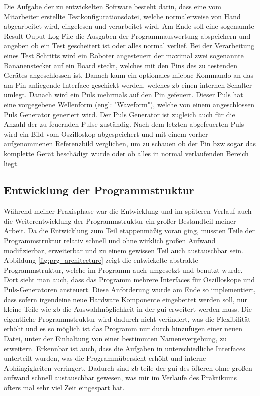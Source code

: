 Die Aufgabe der zu entwickelten Software besteht darin, dass eine vom Mitarbeiter erstellte Testkonfigurationsdatei, welche normalerweise von Hand abgearbeitet wird, eingelesen und verarbeitet wird. Am Ende soll eine sogenannte Result Ouput Log File die Ausgaben der Programmauswertung abspeichern und angeben ob ein Test gescheitert ist oder alles normal verlief.
Bei der Verarbeitung eines Test Schritts wird ein Roboter angesteuert der maximal zwei sogenannte Bananenstecker auf ein Board steckt, welches mit den Pins des zu testenden Gerätes angeschlossen ist. Danach kann ein optionales \ac{micbac} Kommando an das am Pin anliegende Interface geschickt werden, welches \ac{zb} einen internen Schalter umlegt. Danach wird ein Puls mehrmals auf den Pin gefeuert. Dieser Puls hat eine vorgegebene Wellenform (engl: "Waveform"), welche von einem angeschlossen Puls Generator generiert wird. Der Puls Generator ist zugleich auch für die Anzahl der zu feuernden Pulse zuständig. Nach dem letzten abgefeuerten Puls wird ein Bild vom Oszilloskop abgespeichert und mit einem vorher aufgenommenen Referenzbild verglichen, um zu schauen ob der Pin \ac{bzw} sogar das komplette Gerät beschädigt wurde oder ob alles in normal verlaufenden Bereich liegt. 


\subsection{Entwicklung der Programmstruktur}
\label{subsec:entw-prgstr}

Während meiner Praxisphase war die Entwicklung und im späteren Verlauf auch die Weiterentwicklung der Programmstruktur ein großer Bestandteil meiner Arbeit. Da die Entwicklung zum Teil etappenmäßig voran ging, mussten Teile der Programmstruktur relativ schnell und ohne wirklich großen Aufwand modifizierbar, erweiterbar und zu einem gewissen Teil auch austauschbar sein. Abbildung \ref{fig:prg_architecture} zeigt die entwickelte abstrakte Programmstruktur, welche im Programm auch umgesetzt und benutzt wurde. Dort sieht man auch, dass das Programm mehrere Interfaces für Oszilloskope und Puls-Generatoren ansteuert. Diese Anforderung wurde am Ende so implementiert, dass sofern irgendeine neue Hardware Komponente eingebettet werden soll, nur kleine Teile wie \ac{zb} die Auswahlmöglichkeit in der \ac{gui} erweitert werden muss. Die eigentliche Programmstruktur wird dadurch nicht verändert, was die Flexibilität erhöht und es so möglich ist das Programm nur durch hinzufügen einer neuen Datei, unter der Einhaltung von einer bestimmten  Namensvergebung, zu erweitern. Erkennbar ist auch, dass die Aufgaben in unterschiedliche Interfaces unterteilt wurden, was die Programmübersicht erhöht und  interne Abhängigkeiten verringert. Dadurch sind \ac{zb} teile der \ac{gui} des öfteren ohne großen aufwand schnell austauschbar gewesen, was mir im Verlaufe des Praktikums öfters mal sehr viel Zeit eingespart hat.

